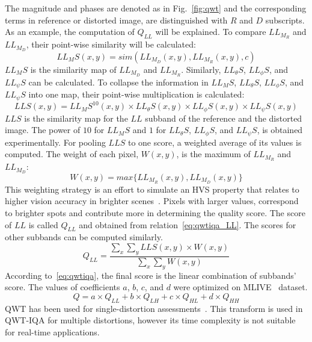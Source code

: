 The magnitude and phases are denoted as in Fig.~\ref{fig:qwt} and the corresponding terms in reference or distorted image, are distinguished with $R$ and $D$ subscripts. As an example, the computation of $Q_{LL}$ will be explained. To compare $LL_{M_R}$ and $LL_{M_D}$, their point-wise similarity will be calculated:
\begin{equation}
    LL_MS(x, y) = sim(LL_{M_D}(x, y), LL_{M_R}(x, y), c)
    \label{eq:LL_MS}
\end{equation}
$LL_MS$ is the similarity map of $LL_{M_D}$ and $LL_{M_R}$. Similarly, $LL_\theta S$, $LL_\phi S$, and $LL_\psi S$ can be calculated. To collapse the information in $LL_MS$, $LL_\theta S$, $LL_\phi S$, and $LL_\psi S$ into one map, their point-wise multiplication is calculated:
\begin{equation}
    LLS(x, y) = LL_MS^{10}(x, y)\times LL_\theta S(x, y)\times LL_\phi S(x, y)\times LL_\psi S(x, y)
    \label{eq:LLS}
\end{equation}
$LLS$ is the similarity map for the $LL$ subband of the reference and the distorted image. The power of $10$ for $LL_MS$ and $1$ for $LL_\theta S$, $LL_\phi S$, and $LL_\psi S$, is obtained experimentally. For pooling $LLS$ to one score, a weighted average of its values is computed. The weight of each pixel, $W(x, y)$, is the maximum of $LL_{M_R}$ and $LL_{M_D}$:
\begin{equation}
    W(x, y) = max\{LL_{M_R}(x, y), LL_{M_D}(x, y)\}
    \label{eq:weight_qwt}
\end{equation}
This weighting strategy is an effort to simulate an HVS property that relates to higher vision accuracy in brighter scenes~\cite{Gonzalez2008}. Pixels with larger values, correspond to brighter spots and contribute more in determining the quality score. The score of $LL$ is called $Q_{LL}$ and obtained from relation~\ref{eq:qwtiqa_LL}. The scores for other subbands can be computed similarly.
\begin{equation}
    Q_{LL} = \frac{\sum_x\sum_yLLS(x, y)\times W(x, y)}{\sum_x \sum_y W(x, y)}
    \label{eq:qwtiqa_LL}
\end{equation}
According to~\ref{eq:qwtiqa}, the final score is the linear combination of subbands' score. The values of coefficients $a$, $b$, $c$, and $d$ were optimized on MLIVE~\cite{Jayaraman2012} dataset.
\begin{equation}
    Q = a\times Q_{LL}+b\times Q_{LH}+c\times Q_{HL}+d\times Q_{HH}
    \label{eq:qwtiqa}
\end{equation}
QWT has been used for single-distortion assessments~\cite{chen2013image, traore2014reduced, Tang2017}. This transform is used in QWT-IQA for multiple distortions, however its time complexity is not suitable for real-time applications.
